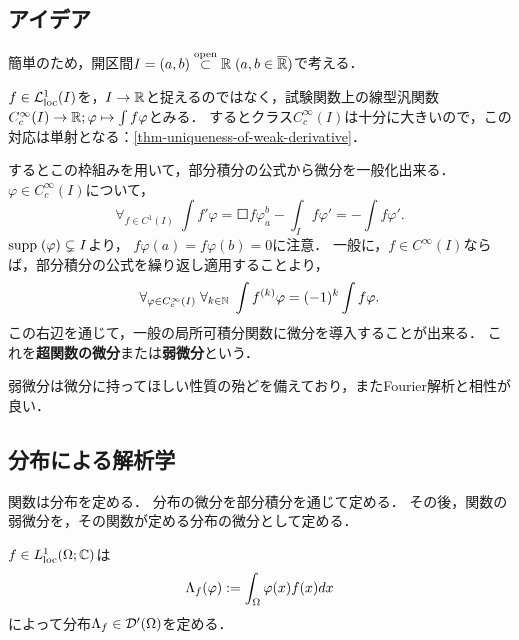 \documentclass[uplatex,dvipdfmx]{jsreport}
\begin{document}
\subsection{アイデア}

簡単のため，開区間$I=(a,b)\overset{\mathrm{open}}{\subset}\mathbb{R}\;(a,b\in\overline{\mathbb{R}})$で考える．

\begin{discussion}[Rieszの表現流の発想の転換]
    $f\in\mathcal{L}^1_{\mathrm{loc}}(I)$を，$I\to\mathbb{R}$と捉えるのではなく，試験関数上の線型汎関数
    $C_c^\infty(I)\to\mathbb{R};\varphi\mapsto\int f\varphi$とみる．
    するとクラス$C_c^\infty(I)$は十分に大きいので，この対応は単射となる：\ref{thm-uniqueness-of-weak-derivative}．
\end{discussion}

\begin{discussion}[微分の導入]
    するとこの枠組みを用いて，部分積分の公式から微分を一般化出来る．
    $\varphi\in C_c^\infty(I)$について，
    \[\forall_{f\in C^1(I)}\;\int f'\varphi=\Square{f\varphi}^b_a-\int_If\varphi'=-\int f\varphi'.\]
    $\mathrm{supp}\;(\varphi)\subsetneq I$より，
    $f\varphi(a)=f\varphi(b)=0$に注意．
    一般に，$f\in C^\infty(I)$ならば，部分積分の公式を繰り返し適用することより，
    \[\forall_{\varphi\in C_c^\infty(I)}\;\forall_{k\in\mathbb{N}}\;\int f^{(k)}\varphi=(-1)^k\int f\varphi.\]
    この右辺を通じて，一般の局所可積分関数に微分を導入することが出来る．
    これを\textbf{超関数の微分}または\textbf{弱微分}という．
\end{discussion}

弱微分は微分に持ってほしい性質の殆どを備えており，またFourier解析と相性が良い．

\subsection{分布による解析学}

\begin{tcolorbox}[colframe=ForestGreen, colback=ForestGreen!10!white,breakable,colbacktitle=ForestGreen!40!white,coltitle=black,fonttitle=\bfseries\sffamily,
title=]
    関数は分布を定める．
    分布の微分を部分積分を通じて定める．
    その後，関数の弱微分を，その関数が定める分布の微分として定める．
\end{tcolorbox}

\begin{example}[関数は分布]
    $f\in L^1_{\mathrm{loc}}(\Omega;\mathbb{C})$は
    \[\Lambda_f(\varphi):=\int_\Omega\varphi(x)f(x)dx\]
    によって分布$\Lambda_f\in\mathcal{D}'(\Omega)$を定める．
\end{example}
\end{document}
